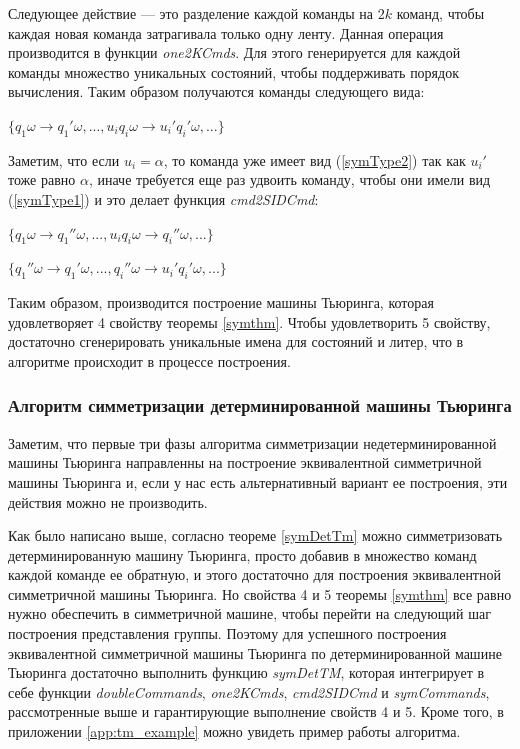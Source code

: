 \documentclass[14pt]{matmex-diploma-custom}
\begin{document}
Следующее действие --- это разделение каждой команды на $2k$ команд, чтобы каждая новая команда затрагивала только одну ленту. Данная операция производится в функции \textit{one2KCmds}. Для этого генерируется для каждой команды множество уникальных состояний, чтобы поддерживать порядок вычисления. Таким образом получаются команды следующего вида: 
\begin{center}
    $\{ q_1 \omega \to q_1' \omega , ... , u_i q_i \omega \to u_i' q_i' \omega , ... \}$
\end{center}

Заметим, что если $u_i = \alpha$, то команда уже имеет вид (\ref{symType2}) так как $u_i'$ тоже равно $\alpha$, иначе требуется еще раз удвоить команду, чтобы они имели вид (\ref{symType1}) и это делает функция \textit{cmd2SIDCmd}:

\begin{center}
    $\{ q_1 \omega \to q_1'' \omega , ... , u_i q_i \omega \to q_i'' \omega , ... \}$
\end{center}

\begin{center}
    $\{ q_1'' \omega \to q_1' \omega , ... , q_i'' \omega \to u_i' q_i' \omega , ... \}$
\end{center}

Таким образом, производится построение машины Тьюринга, которая удовлетворяет 4 свойству теоремы \ref{symthm}. Чтобы удовлетворить 5 свойству, достаточно сгенерировать уникальные имена для состояний и литер, что в алгоритме происходит в процессе построения. 

\subsubsection{Алгоритм симметризации детерминированной машины Тьюринга}
Заметим, что первые три фазы алгоритма симметризации недетерминированной машины Тьюринга направленны на построение эквивалентной симметричной машины Тьюринга и, если у нас есть альтернативный вариант ее построения, эти действия можно не производить. 

Как было написано выше, согласно теореме \ref{symDetTm} можно симметризовать детерминированную машину Тьюринга, просто добавив в множество команд каждой команде ее обратную, и этого достаточно для построения эквивалентной симметричной машины Тьюринга. Но свойства 4 и 5 теоремы \ref{symthm} все равно нужно обеспечить в симметричной машине, чтобы перейти на следующий шаг построения представления группы. 
Поэтому для успешного построения эквивалентной симметричной машины Тьюринга по детерминированной машине Тьюринга достаточно выполнить функцию \textit{symDetTM}, которая интегрирует в себе функции \textit{doubleCommands}, \textit{one2KCmds}, \textit{cmd2SIDCmd} и \textit{symCommands}, рассмотренные выше и гарантирующие выполнение свойств 4 и 5. Кроме того, в приложении \ref{app:tm_example} можно увидеть пример работы алгоритма.
\end{document}

